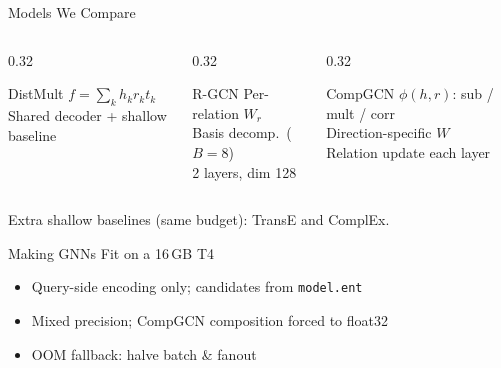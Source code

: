 \documentclass[aspectratio=43,11pt]{beamer}
\begin{document}
\begin{frame}{Models We Compare}
  \begin{columns}[T]
    \begin{column}{0.32\textwidth}
      \begin{block}{DistMult}
        $f=\sum_k h_k r_k t_k$\\
        Shared decoder + shallow baseline
      \end{block}
    \end{column}
    \begin{column}{0.32\textwidth}
      \begin{block}{R-GCN}
        Per-relation $W_r$\\
        Basis decomp.\ ($B{=}8$)\\
        2 layers, dim 128
      \end{block}
    \end{column}
    \begin{column}{0.32\textwidth}
      \begin{block}{CompGCN}
        $\phi(h,r)$: sub / mult / corr\\
        Direction-specific $W$\\
        Relation update each layer
      \end{block}
    \end{column}
  \end{columns}
  \vspace{0.6em}
  Extra shallow baselines (same budget): TransE and ComplEx.
\end{frame}

\begin{frame}{Making GNNs Fit on a 16\,GB T4}
  \begin{center}
  \end{center}
  \vspace{0.5em}
  \begin{itemize}
    \item Query-side encoding only; candidates from \texttt{model.ent}
    \item Mixed precision; CompGCN composition forced to float32
    \item OOM fallback: halve batch \& fanout
  \end{itemize}
\end{frame}
\end{document}
